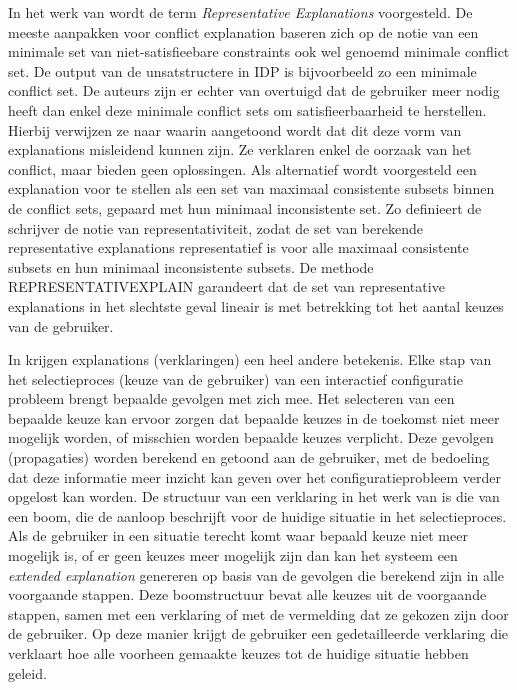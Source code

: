 In het werk van \citet{o2007representative} wordt de term \textit{Representative Explanations} voorgesteld. De meeste aanpakken voor conflict explanation baseren zich op de notie van een minimale set van niet-satisfieebare constraints ook wel genoemd minimale conflict set. De output van de unsatstructere in IDP is bijvoorbeeld zo een minimale conflict set. De auteurs zijn er echter van overtuigd dat de gebruiker meer nodig heeft dan enkel deze minimale conflict sets om satisfieerbaarheid te herstellen. Hierbij verwijzen ze naar \citep{friedrich2004elimination} waarin aangetoond wordt dat dit deze vorm van explanations misleidend kunnen zijn. Ze verklaren enkel de oorzaak van het conflict, maar bieden geen oplossingen. Als alternatief wordt voorgesteld een explanation voor te stellen als een set van maximaal consistente subsets binnen de conflict sets, gepaard met hun minimaal inconsistente set. Zo definieert de schrijver de notie van representativiteit, zodat de set van berekende representative explanations representatief is voor alle maximaal consistente subsets en hun minimaal inconsistente subsets. De methode REPRESENTATIVEXPLAIN garandeert dat de set van representative explanations in het slechtste geval lineair is met betrekking tot het aantal keuzes van de gebruiker.

In \citep{freuder2001explanation} krijgen explanations (verklaringen) een heel andere betekenis. Elke stap van het selectieproces (keuze van de gebruiker) van een interactief configuratie probleem brengt bepaalde gevolgen met zich mee. Het selecteren van een bepaalde keuze kan ervoor zorgen dat bepaalde keuzes in de toekomst niet meer mogelijk worden, of misschien worden bepaalde keuzes verplicht. Deze gevolgen (propagaties) worden berekend en getoond aan de gebruiker, met de bedoeling dat deze informatie meer inzicht kan geven over het configuratieprobleem verder opgelost kan worden. De structuur van een verklaring in het werk van \citep{freuder2001explanation} is die van een boom, die de aanloop beschrijft voor de huidige situatie in het selectieproces. Als de gebruiker in een situatie terecht komt waar bepaald keuze niet meer mogelijk is, of er geen keuzes meer mogelijk zijn dan kan het systeem een \textit{extended explanation} genereren op basis van de gevolgen die berekend zijn in alle voorgaande stappen. Deze boomstructuur bevat alle keuzes uit de voorgaande stappen, samen met een verklaring of met de vermelding dat ze gekozen zijn door de gebruiker. Op deze manier krijgt de gebruiker een gedetailleerde verklaring die verklaart hoe alle voorheen gemaakte keuzes tot de huidige situatie hebben geleid.